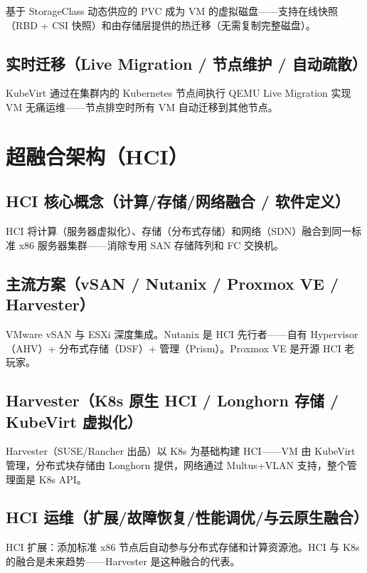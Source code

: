 \documentclass[12pt,UTF8]{ctexbook}
\begin{document}
基于 StorageClass 动态供应的 PVC 成为 VM 的虚拟磁盘——支持在线快照（RBD + CSI 快照）和由存储层提供的热迁移（无需复制完整磁盘）。

    \subsection{实时迁移（Live Migration / 节点维护 / 自动疏散）}

KubeVirt 通过在集群内的 Kubernetes 节点间执行 QEMU Live Migration 实现 VM 无痛运维——节点排空时所有 VM 自动迁移到其他节点。

  \section{超融合架构（HCI）}
    \subsection{HCI 核心概念（计算/存储/网络融合 / 软件定义）}

HCI 将计算（服务器虚拟化）、存储（分布式存储）和网络（SDN）融合到同一标准 x86 服务器集群——消除专用 SAN 存储阵列和 FC 交换机。

    \subsection{主流方案（vSAN / Nutanix / Proxmox VE / Harvester）}

VMware vSAN 与 ESXi 深度集成。Nutanix 是 HCI 先行者——自有 Hypervisor（AHV）+ 分布式存储（DSF）+ 管理（Prism）。Proxmox VE 是开源 HCI 老玩家。

    \subsection{Harvester（K8s 原生 HCI / Longhorn 存储 / KubeVirt 虚拟化）}

Harvester（SUSE/Rancher 出品）以 K8s 为基础构建 HCI——VM 由 KubeVirt 管理，分布式块存储由 Longhorn 提供，网络通过 Multus+VLAN 支持，整个管理面是 K8s API。

    \subsection{HCI 运维（扩展/故障恢复/性能调优/与云原生融合）}

HCI 扩展：添加标准 x86 节点后自动参与分布式存储和计算资源池。HCI 与 K8s 的融合是未来趋势——Harvester 是这种融合的代表。


\end{document}
